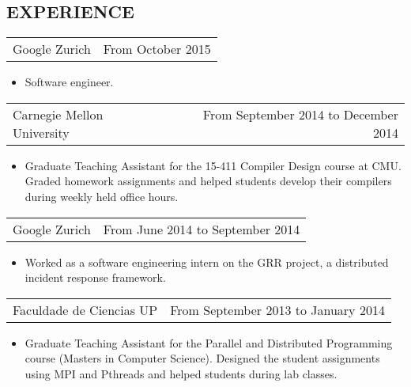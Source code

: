 \documentclass[margin]{res}
\begin{document}
\begin{resume}
\section{EXPERIENCE}
            
                  \begin{tabular}{p{3in} r} %
                    Google Zurich &  From October 2015
                   \end{tabular}
                    \begin{itemize}
                      \item[] Software engineer.
                    \end{itemize}
                  \begin{tabular}{p{3in} r} %
                    Carnegie Mellon University &  From September 2014 to December 2014
                   \end{tabular}
                    \begin{itemize}					        
                     \item[] Graduate Teaching Assistant for the 15-411 Compiler Design course at CMU. Graded homework assignments and helped students develop their compilers during weekly held office hours.
                    \end{itemize}

                  \begin{tabular}{p{3in} r} %
                    Google Zurich &  From June 2014 to September 2014
                   \end{tabular}
                    \begin{itemize}
                      \item[] Worked as a software engineering intern on the GRR project, a distributed incident response framework.
                    \end{itemize}

                  \begin{tabular}{p{3in} r} %
                    Faculdade de Ciencias UP &  From September 2013 to January 2014
                   \end{tabular}
                    \begin{itemize}					        
                     \item[] Graduate Teaching Assistant for the Parallel and Distributed Programming course (Masters in Computer Science). Designed the student assignments using MPI and Pthreads and helped students during lab classes.
                    \end{itemize}


\end{resume}
\end{document}
